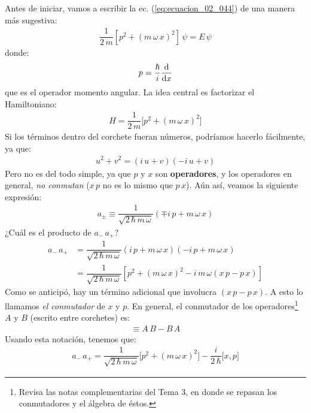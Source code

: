 \documentclass[12pt]{article}
\numberwithin{equation}{section}
\begin{document}
Antes de iniciar, vamos a escribir la ec. (\ref{eq:ecuacion_02_044}) de una manera más sugestiva:
\begin{align}
\dfrac{1}{2 \, m} \left[ p^{2} + (m \, \omega \, x)^{2} \right] \, \psi = E \, \psi
\label{eq:ecuacion_02_045}
\end{align}
donde:
\begin{align*}
p = \dfrac{\hbar}{i} \dv{x}
\end{align*}
que es el operador momento angular. La idea central es factorizar el Hamiltoniano:
\begin{align}
H = \dfrac{1}{2 \, m} \big[ p^{2} + (m \, \omega \, x)^{2} \big]
\label{eq:ecuacion_02_046}
\end{align}
Si los términos dentro del corchete fueran números, podríamos hacerlo fácilmente, ya que:
\begin{align*}
u^{2} + v^{2} = ( i \, u +  v)(- i \, u + v)
\end{align*}
Pero no es del todo simple, ya que $p$ y $x$ son \textbf{operadores}, y los operadores en general, \textit{no conmutan} ($x \, p$ no es lo mismo que $p \, x$). Aún así, veamos la siguiente expresión:
\begin{align}
a_{\pm} \equiv \dfrac{1}{\sqrt{2 \, \hbar \, m \, \omega }} \left( \mp i \, p + m \, \omega \, x \right)
\label{eq:ecuacion_02_047}
\end{align}
¿Cuál es el producto de $a_{-} \, a_{+}$?
\begin{align*}
a_{-} \, a_{+} &= \dfrac{1}{\sqrt{2 \, \hbar \, m \, \omega }} \left( i \, p + m \, \omega \, x \right) \left( - i \, p + m \, \omega \, x \right) \\[0.5em]
&= \dfrac{1}{\sqrt{2 \, \hbar \, m \, \omega }} \left[ p^{2} + (m \, \omega \, x)^{2} - i \, m \, \omega (x \, p - p \, x) \right]
\end{align*}
Como se anticipó, hay un término adicional que involucra $(x \, p - p \, x)$. A esto lo llamamos \emph{el conmutador} de $x$ y $p$. En general, el conmutador de los operadores\footnote{Revisa las notas complementarias del Tema 3, en donde se repasan los conmutadores y el álgebra de éstos.} $A$ y $B$ (escrito entre corchetes) es:
\begin{align}
[A, B] \equiv A \, B - B \, A
\label{eq:ecuacion_02_048}
\end{align}
Usando esta notación, tenemos que:
\begin{align}
a_{-} \, a_{+} = \dfrac{1}{\sqrt{2 \, \hbar \, m \, \omega }} \big[ p^{2} + (m \, \omega \, x)^{2} \big] - \dfrac{i}{2 \, \hbar} \big[ x , p \big]
\label{eq:ecuacion_02_049}
\end{align}
\end{document}
